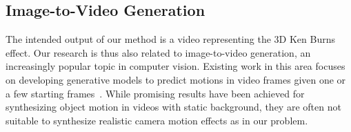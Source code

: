 \documentclass[acmtog,authorversion]{acmart}
\begin{document}
\subsection{Image-to-Video Generation}

The intended output of our method is a video representing the 3D Ken Burns effect. Our research is thus also related to image-to-video generation, an increasingly popular topic in computer vision. Existing work in this area focuses on developing generative models to predict motions in video frames given one or a few starting frames~\cite{Hsieh_NIPS_2018, Lee_ARXIV_2018, Liang_ICCV_2017, Mathieu_ARXIV_2015, Reda_ECCV_2018, Vondrick_NIPS_2016, Xu_CVPR_2018}. While promising results have been achieved for synthesizing object motion in videos with static background, they are often not suitable to synthesize realistic camera motion effects as in our problem. 
\end{document}
